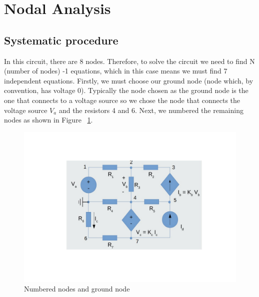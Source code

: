 \section{Nodal Analysis}
\label{sec:nodal analysis}

\subsection{Systematic procedure}
In this circuit, there are 8 nodes. Therefore, to solve the circuit we need to find N (number of nodes) -1 equations, which in this case means we must find 7 independent equations. Firstly, we must choose our ground node (node which, by convention, has voltage 0). Typically the node chosen as the ground node is the one that connects to a voltage source so we chose the node that connects the voltage source $V_{a}$ and the resistors 4 and 6. Next, we numbered the remaining nodes as shown in Figure ~\ref{fig:nodes}.

\begin{figure}[ht] \centering
\includegraphics[width=0.8\linewidth]{circuitonodos.pdf}
\caption{Numbered nodes and ground node}
\label{fig:nodes}
\end{figure}
